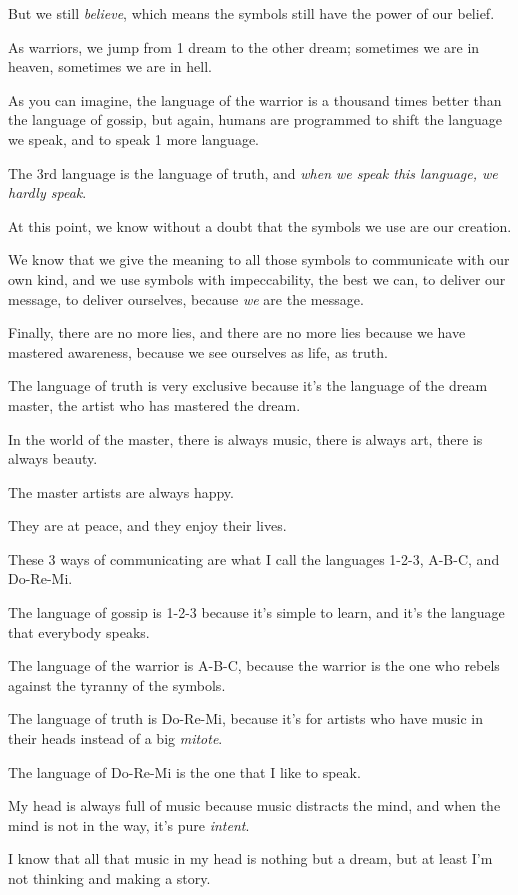 \documentclass{article}
\numberwithin{equation}{section}
\begin{document}
But we still \textit{believe}, which means the symbols still have the power of our belief.

As warriors, we jump from 1 dream to the other dream; sometimes we are in heaven, sometimes we are in hell.

As you can imagine, the language of the warrior is a thousand times better than the language of gossip, but again, humans are programmed to shift the language we speak, and to speak 1 more language.

%
The 3rd language is the language of truth, and \textit{when we speak this language, we hardly speak}.

At this point, we know without a doubt that the symbols we use are our creation.

We know that we give the meaning to all those symbols to communicate with our own kind, and we use symbols with impeccability, the best we can, to deliver our message, to deliver ourselves, because \textit{we} are the message.

Finally, there are no more lies, and there are no more lies because we have mastered awareness, because we see ourselves as life, as truth.

%
The language of truth is very exclusive because it's the language of the dream master, the artist who has mastered the dream.

In the world of the master, there is always music, there is always art, there is always beauty.

The master artists are always happy.

They are at peace, and they enjoy their lives.

%
These 3 ways of communicating are what I call the languages 1-2-3, A-B-C, and Do-Re-Mi.

The language of gossip is 1-2-3 because it's simple to learn, and it's the language that everybody speaks.

The language of the warrior is A-B-C, because the warrior is the one who rebels against the tyranny of the symbols.

The language of truth is Do-Re-Mi, because it's for artists who have music in their heads instead of a big \textit{mitote}.

%
The language of Do-Re-Mi is the one that I like to speak.

My head is always full of music because music distracts the mind, and when the mind is not in the way, it's pure \textit{intent}.

I know that all that music in my head is nothing but a dream, but at least I'm not thinking and making a story.
\end{document}
